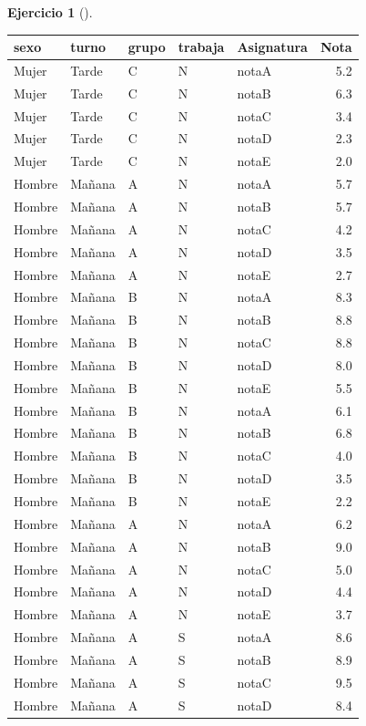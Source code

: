 \documentclass[
  a4paper,
]{scrreport}
\theoremstyle{definition}
\newtheorem{exercise}{Ejercicio}[chapter]
\theoremstyle{remark}
\begin{document}
\begin{exercise}[]
\begin{enumerate}
\begin{tcolorbox}
  \begin{longtable}[]{@{}lllllr@{}}
  \toprule\noalign{}
  sexo & turno & grupo & trabaja & Asignatura & Nota \\
  \midrule\noalign{}
  \endhead
  \bottomrule\noalign{}
  \endlastfoot
  Mujer & Tarde & C & N & notaA & 5.2 \\
  Mujer & Tarde & C & N & notaB & 6.3 \\
  Mujer & Tarde & C & N & notaC & 3.4 \\
  Mujer & Tarde & C & N & notaD & 2.3 \\
  Mujer & Tarde & C & N & notaE & 2.0 \\
  Hombre & Mañana & A & N & notaA & 5.7 \\
  Hombre & Mañana & A & N & notaB & 5.7 \\
  Hombre & Mañana & A & N & notaC & 4.2 \\
  Hombre & Mañana & A & N & notaD & 3.5 \\
  Hombre & Mañana & A & N & notaE & 2.7 \\
  Hombre & Mañana & B & N & notaA & 8.3 \\
  Hombre & Mañana & B & N & notaB & 8.8 \\
  Hombre & Mañana & B & N & notaC & 8.8 \\
  Hombre & Mañana & B & N & notaD & 8.0 \\
  Hombre & Mañana & B & N & notaE & 5.5 \\
  Hombre & Mañana & B & N & notaA & 6.1 \\
  Hombre & Mañana & B & N & notaB & 6.8 \\
  Hombre & Mañana & B & N & notaC & 4.0 \\
  Hombre & Mañana & B & N & notaD & 3.5 \\
  Hombre & Mañana & B & N & notaE & 2.2 \\
  Hombre & Mañana & A & N & notaA & 6.2 \\
  Hombre & Mañana & A & N & notaB & 9.0 \\
  Hombre & Mañana & A & N & notaC & 5.0 \\
  Hombre & Mañana & A & N & notaD & 4.4 \\
  Hombre & Mañana & A & N & notaE & 3.7 \\
  Hombre & Mañana & A & S & notaA & 8.6 \\
  Hombre & Mañana & A & S & notaB & 8.9 \\
  Hombre & Mañana & A & S & notaC & 9.5 \\
  Hombre & Mañana & A & S & notaD & 8.4 \\

\end{longtable}
\end{tcolorbox}
\end{enumerate}
\end{exercise}
\end{document}
